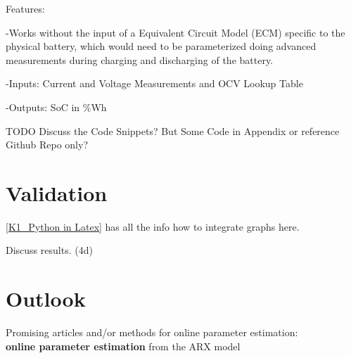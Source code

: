Features: \

-Works without the input of a Equivalent Circuit Model (ECM) specific to the physical battery, which would need to be parameterized doing advanced measurements during charging and discharging of the battery. 

-Inputs: Current and Voltage Measurements and OCV Lookup Table

-Outputs: SoC in \%Wh

TODO Discuss the Code Snippets? But Some Code in Appendix or reference Github Repo only? 
\chapter{Validation}


\ref{K1_Python in Latex} has all the info how to integrate graphs here. 
 
Discuss results.  (4d)

\chapter{Outlook}

Promising articles and/or methods for online parameter estimation: \\ 

\textbf{online parameter estimation} from the ARX model  \cite{tran2017state}

\cite{xia2018online}
\cite{wang2021augmented}